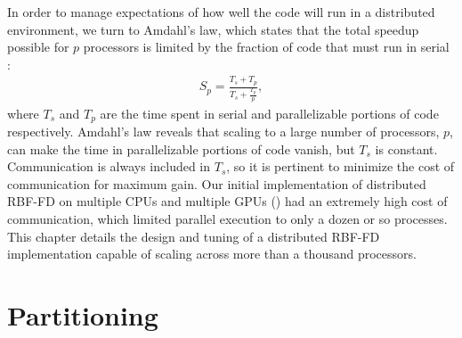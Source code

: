 \documentclass{report}
\begin{document}
In order to manage expectations of how well the code will run in a distributed environment, we turn to Amdahl's law, which states that the total speedup possible for $p$ processors is limited by the fraction of code that must run in serial \cite{Shi2012}:
\begin{align}
S_p = \frac{T_s + T_p}{T_s + \frac{T_p}{p}},  \nonumber
\end{align}
where $T_s$ and $T_p$ are the time spent in serial and parallelizable portions of code respectively. Amdahl's law reveals that scaling to a large number of processors, $p$, can make the time in parallelizable portions of code vanish, but $T_s$ is constant. Communication is always included in $T_s$, so it is pertinent to minimize the cost of communication for maximum gain. Our initial implementation of distributed RBF-FD on multiple CPUs and multiple GPUs (\cite{BolligFlyerErlebacher2012}) had an extremely high cost of communication, which limited parallel execution to only a dozen or so processes. This chapter details the design and tuning of a distributed RBF-FD implementation capable of scaling across more than a thousand processors. 










\section{Partitioning}
\end{document}
